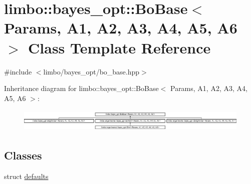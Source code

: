 \hypertarget{classlimbo_1_1bayes__opt_1_1_bo_base}{}\section{limbo\+:\+:bayes\+\_\+opt\+:\+:Bo\+Base$<$ Params, A1, A2, A3, A4, A5, A6 $>$ Class Template Reference}
\label{classlimbo_1_1bayes__opt_1_1_bo_base}


{\ttfamily \#include $<$limbo/bayes\+\_\+opt/bo\+\_\+base.\+hpp$>$}

Inheritance diagram for limbo\+:\+:bayes\+\_\+opt\+:\+:Bo\+Base$<$ Params, A1, A2, A3, A4, A5, A6 $>$\+:\begin{figure}[H]
\begin{center}
\leavevmode
\includegraphics[height=1.104536cm]{classlimbo_1_1bayes__opt_1_1_bo_base}
\end{center}
\end{figure}
\subsection*{Classes}
\begin{DoxyCompactItemize}
\item 
struct \hyperlink{structlimbo_1_1bayes__opt_1_1_bo_base_1_1defaults}{defaults}
\end{DoxyCompactItemize}
